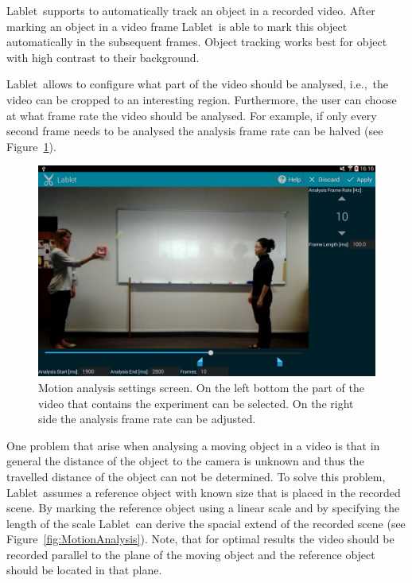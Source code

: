 \documentclass{sigchi}
\newcommand{\ie}{i.e.,\ }
\newcommand{\lablet}{Lablet\ }
\begin{document}
\lablet supports to automatically track an object in a recorded video.
After marking an object in a video frame \lablet is able to mark this object automatically in the subsequent frames.
Object tracking works best for object with high contrast to their background.

\lablet allows to configure what part of the video should be analysed, \ie the video can be cropped to an interesting region.
Furthermore, the user can choose at what frame rate the video should be analysed.
For example, if only every second frame needs to be analysed the analysis frame rate can be halved (see Figure~\ref{fig:MotionAnalysisSettingsScreen}).

\begin{figure}
  \centering
  \includegraphics[width=.99\columnwidth]{MotionAnalysisSettings}
  \caption{Motion analysis settings screen.
  On the left bottom the part of the video that contains the experiment can be selected.
On the right side the analysis frame rate can be adjusted.\label{fig:MotionAnalysisSettingsScreen}}
\end{figure}

One problem that arise when analysing a moving object in a video is that in general the distance of the object to the camera is unknown and thus the travelled distance of the object can not be determined.
To solve this problem, \lablet assumes a reference object with known size that is placed in the recorded scene.
By marking the reference object using a linear scale and by specifying the length of the scale \lablet can derive the spacial extend of the recorded scene (see Figure~\ref{fig:MotionAnalysis}).
Note, that for optimal results the video should be recorded parallel to the plane of the moving object and the reference object should be located in that plane.
\end{document}
